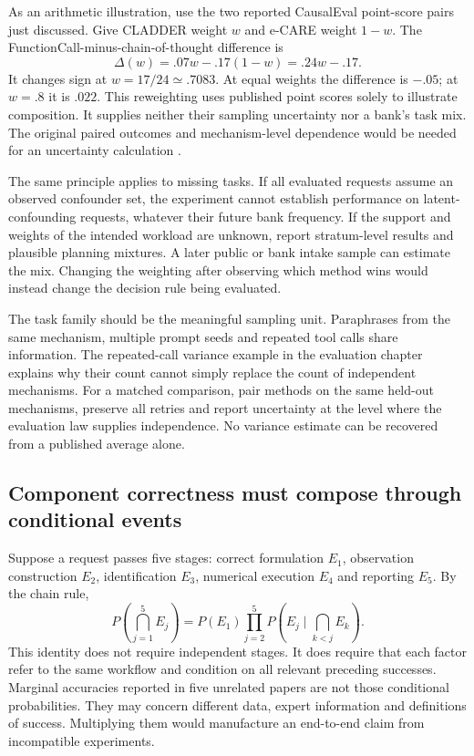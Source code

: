 As an arithmetic illustration, use the two reported CausalEval point-score
pairs just discussed. Give CLADDER weight $w$ and e-CARE weight $1-w$. The
FunctionCall-minus-chain-of-thought difference is
\begin{equation}
 \Delta(w)=.07w-.17(1-w)=.24w-.17.
 \label{exec13:frontier-rank}
\end{equation}
It changes sign at $w=17/24\simeq.7083$. At equal weights the difference is
$-.05$; at $w=.8$ it is $.022$. This reweighting uses published point scores
solely to illustrate composition. It supplies neither their sampling
uncertainty nor a bank's task mix. The original paired outcomes and
mechanism-level dependence would be needed for an uncertainty calculation
\cite{exec13_census_causaleval,exec13_frontier_exact}.

The same principle applies to missing tasks. If all evaluated requests assume
an observed confounder set, the experiment cannot establish performance on
latent-confounding requests, whatever their future bank frequency. If the
support and weights of the intended workload are unknown, report stratum-level
results and plausible planning mixtures. A later public or bank intake sample
can estimate the mix. Changing the weighting after observing which method wins
would instead change the decision rule being evaluated.

The task family should be the meaningful sampling unit. Paraphrases from the
same mechanism, multiple prompt seeds and repeated tool calls share information.
The repeated-call variance example in the evaluation chapter explains why
their count cannot simply replace the count of independent mechanisms. For a
matched comparison, pair methods on the same held-out mechanisms, preserve all
retries and report uncertainty at the level where the evaluation law supplies
independence. No variance estimate can be recovered from a published average
alone.

\subsection{Component correctness must compose through conditional events}

Suppose a request passes five stages: correct formulation $E_1$, observation
construction $E_2$, identification $E_3$, numerical execution $E_4$ and
reporting $E_5$. By the chain rule,
\begin{equation}
 P\!\left(\bigcap_{j=1}^5 E_j\right)
 =P(E_1)\prod_{j=2}^5P\!\left(E_j\mid\bigcap_{k<j}E_k\right).
 \label{exec13:frontier-chain}
\end{equation}
This identity does not require independent stages. It does require that each
factor refer to the same workflow and condition on all relevant preceding
successes. Marginal accuracies reported in five unrelated papers are not those
conditional probabilities. They may concern different data, expert information
and definitions of success. Multiplying them would manufacture an end-to-end
claim from incompatible experiments.

